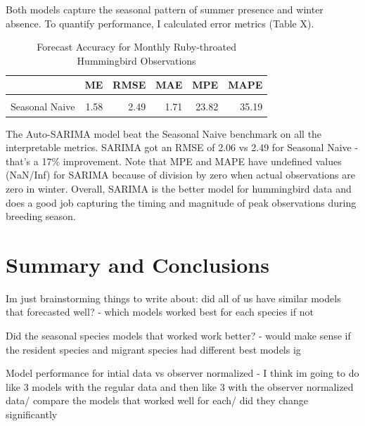 \documentclass[
]{article}
\begin{document}
Both models capture the seasonal pattern of summer presence and winter
absence. To quantify performance, I calculated error metrics (Table X).

\begin{table}[!h]
\centering
\caption{\label{tab:humm_accuracy}Forecast Accuracy for Monthly Ruby-throated Hummingbird Observations}
\centering
\begin{tabular}[t]{lrrrrr}
\toprule
  & ME & RMSE & MAE & MPE & MAPE\\
\midrule
\cellcolor{gray!10}{Auto-SARIMA} & \cellcolor{gray!10}{0.77} & \cellcolor{gray!10}{2.06} & \cellcolor{gray!10}{1.16} & \cellcolor{gray!10}{NaN} & \cellcolor{gray!10}{Inf}\\
Seasonal Naive & 1.58 & 2.49 & 1.71 & 23.82 & 35.19\\
\bottomrule
\end{tabular}
\end{table}

The Auto-SARIMA model beat the Seasonal Naive benchmark on all the
interpretable metrics. SARIMA got an RMSE of 2.06 vs 2.49 for Seasonal
Naive - that's a 17\% improvement. Note that MPE and MAPE have undefined
values (NaN/Inf) for SARIMA because of division by zero when actual
observations are zero in winter. Overall, SARIMA is the better model for
hummingbird data and does a good job capturing the timing and magnitude
of peak observations during breeding season.

\section{Summary and Conclusions}\label{summary-and-conclusions}

Im just brainstorming things to write about: did all of us have similar
models that forecasted well? - which models worked best for each species
if not

Did the seasonal species models that worked work better? - would make
sense if the resident species and migrant species had different best
models ig

Model performance for intial data vs observer normalized - I think im
going to do like 3 models with the regular data and then like 3 with the
observer normalized data/ compare the models that worked well for each/
did they change significantly
\end{document}
